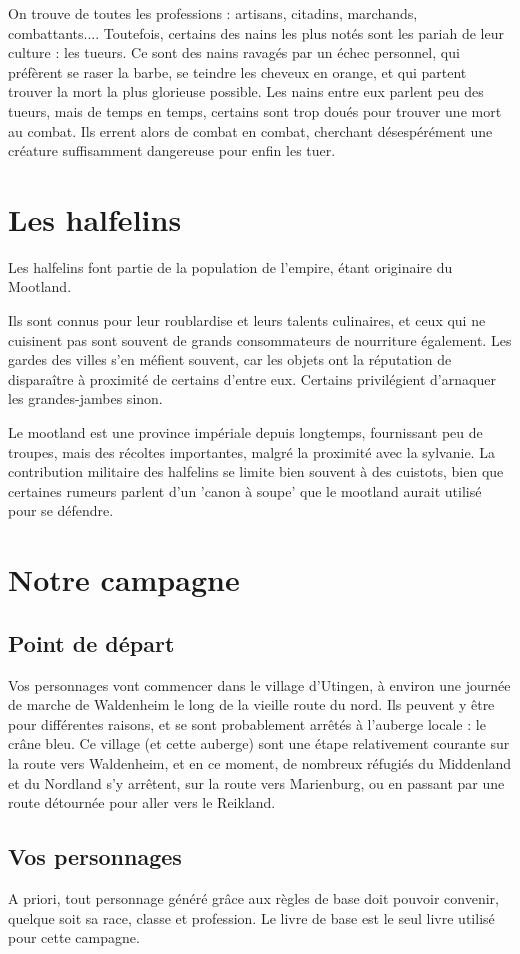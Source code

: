 \documentclass[10pt,a4paper]{book}
\begin{document}
On trouve de toutes les professions : artisans, citadins, marchands, combattants.... Toutefois, certains des nains les plus notés sont les pariah de leur culture : les tueurs. Ce sont des nains ravagés par un échec personnel, qui préfèrent se raser la barbe, se teindre les cheveux en orange, et qui partent trouver la mort la plus glorieuse possible. Les nains entre eux parlent peu des tueurs, mais de temps en temps, certains sont trop doués pour trouver une mort au combat. Ils errent alors de combat en combat, cherchant désespérément une créature suffisamment dangereuse pour enfin les tuer.
\chapter{Les halfelins}
Les halfelins font partie de la population de l'empire, étant originaire du Mootland. 

Ils sont connus pour leur roublardise et leurs talents culinaires, et ceux qui ne cuisinent pas sont souvent de grands consommateurs de nourriture également. Les gardes des villes s'en méfient souvent, car les objets ont la réputation de disparaître à proximité de certains d'entre eux. Certains privilégient d'arnaquer les grandes-jambes sinon.

Le mootland est une province impériale depuis longtemps, fournissant peu de troupes, mais des récoltes importantes, malgré la proximité avec la sylvanie. La contribution militaire des halfelins se limite bien souvent à des cuistots, bien que certaines rumeurs parlent d'un 'canon à soupe' que le mootland aurait utilisé pour se défendre.
\chapter{Notre campagne}
\section{Point de départ}
Vos personnages vont commencer dans le village d'Utingen, à environ une journée de marche de Waldenheim le long de la vieille route du nord. Ils peuvent y être pour différentes raisons, et se sont probablement arrêtés à l'auberge locale : le crâne bleu. Ce village (et cette auberge) sont une étape relativement courante sur la route vers Waldenheim, et en ce moment, de nombreux réfugiés du Middenland et du Nordland s'y arrêtent, sur la route vers Marienburg, ou en passant par une route détournée pour aller vers le Reikland.
\section{Vos personnages}
A priori, tout personnage généré grâce aux règles de base doit pouvoir convenir, quelque soit sa race, classe et profession. Le livre de base est le seul livre utilisé pour cette campagne.
\end{document}
